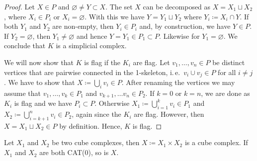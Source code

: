 \begin{proof}
  Let \(X \in P\) and \(\varnothing \neq Y \subset X\). The set \(X\) can be decomposed as \(X = X_1 \sqcup X_2\), where \(X_i \in P_i\) or \(X_i = \varnothing\). With this we have \(Y = Y_1 \sqcup Y_2\) where \(Y_i \coloneqq X_i \cap Y\). If both \(Y_1\) and \(Y_2\) are non-empty, then \(Y_i \in P_i\) and, by construction, we have \(Y \in P\). If \(Y_2 = \varnothing\), then \(Y_1 \neq \varnothing\) and hence \(Y = Y_1 \in P_1 \subset P\). Likewise for \(Y_1 = \varnothing\). We conclude that \(K\) is a simplicial complex.

  We will now show that \(K\) is flag if the \(K_i\) are flag. Let \(v_1, \dots, v_n \in P\) be distinct vertices that are pairwise connected in the 1-skeleton, i.\,e.\ \(v_i \cup v_j \in P\) for all \(i \neq j\). We have to show that \(X \coloneqq \bigcup_i v_i \in P\). After renaming the vertices we may assume that \(v_1, \dots, v_k \in P_1\) and \(v_{k+1}, \dots v_{n} \in P_2\). If \(k=0\) or \(k=n\), we are done as \(K_i\) is flag and we have \(P_i \subset P\). Otherwise \(X_1 \coloneqq \bigcup_{i=1}^kv_i \in P_1\) and \(X_2 \coloneqq \bigcup_{i=k+1}^n v_i \in P_2\), again since the \(K_i\) are flag. However, then \(X = X_1 \sqcup X_2 \in P\) by definition. Hence, \(K\) is flag.
\end{proof}

\begin{prop}
  \label{prop:product-cat}
  Let \(X_1\) and \(X_2\) be two cube complexes, then \(X \coloneqq X_1 \times X_2\) is a cube complex. If \(X_1\) and \(X_2\) are both CAT(0), so is \(X\).
\end{prop}

